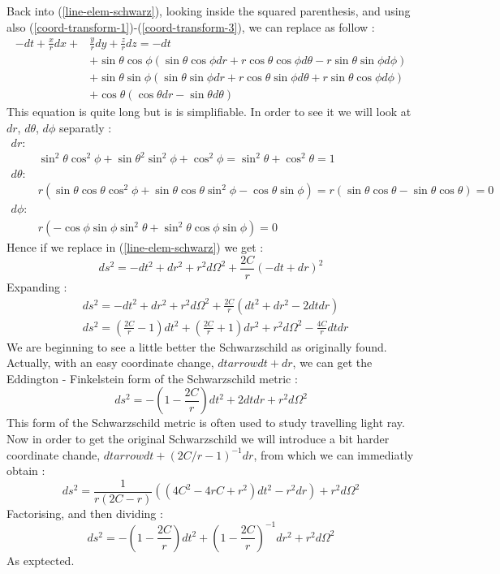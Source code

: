 \documentclass[a4paper,12pt]{article}
\theoremstyle{definition}
\begin{document}
Back into (\ref{line-elem-schwarz}), looking inside the squared parenthesis, and using also (\ref{coord-transform-1})-(\ref{coord-transform-3}), we can replace as follow :
\begin{align}
	-dt+\frac{x}{r}dx+&\frac{y}{r}dy+\frac{z}{r}dz =-dt\\
	&+\sin{\theta} \cos{\phi} (\sin{\theta} \cos{\phi} dr+r\cos{\theta} \cos{\phi} d\theta -r\sin{\theta} \sin{\phi} d\phi )\\
	&+\sin{\theta} \sin{\phi} (\sin{\theta} \sin{\phi} dr+r\cos{\theta} \sin{\phi} d\theta +r\sin{\theta} \cos{\phi} d\phi )\\
	&+\cos{\theta} (\cos{\theta} dr-\sin{\theta} d\theta )
\end{align}
This equation is quite long but is is simplifiable. In order to see it  we will look at $dr$, $d\theta$, $d\phi$ separatly :
\begin{align}
	dr :& \\
	&\sin^2{\theta}\cos^2{\phi}+\sin{\theta}^2\sin^2{\phi}+\cos^2{\phi}=\sin^2{\theta}+\cos^2{\theta}=1\\
	d\theta :& \\
	&r(\sin{\theta}\cos{\theta}\cos^2{\phi}+\sin{\theta}\cos{\theta}\sin^2{\phi}-\cos{\theta}\sin{\phi})=r(\sin{\theta}\cos{\theta}-\sin{\theta}\cos{\theta})=0\\
	d\phi :& \\
	&r(-\cos{\phi}\sin{\phi}\sin^2{\theta}+\sin^2{\theta}\cos{\phi}\sin{\phi})=0
\end{align}
Hence if we replace in (\ref{line-elem-schwarz}) we get :
\begin{equation}
	ds^2=-dt^2+dr^2+r^2d\Omega^2+\frac{2C}{r}(-dt+dr)^2
\end{equation}
Expanding :
\begin{align}
	&ds^2=-dt^2+dr^2+r^2d\Omega^2+\frac{2C}{r}(dt^2+dr^2-2dtdr)\\
	&ds^2=(\frac{2C}{r}-1)dt^2+(\frac{2C}{r}+1)dr^2+r^2d\Omega^2-\frac{4C}{r}dtdr
\end{align}
We are beginning to see a little better the Schwarzschild as originally found.
Actually, with an easy coordinate change, $dtarrow dt+dr$, we can get the Eddington - Finkelstein form of the Schwarzschild metric :
\begin{equation}
	ds^2=-(1-\frac{2C}{r})dt^2+2dtdr+r^2d\Omega^2
\end{equation}
This form of the Schwarzschild metric is often used to study travelling light ray.
Now in order to get the original Schwarzschild we will introduce a bit harder coordinate chande, $dtarrow dt+(2C/r-1)^{-1}dr$, from which we can immediatly obtain :
\begin{equation}
	ds^2=\frac{1}{r(2C-r)}((4C^2-4rC+r^2)dt^2-r^2dr)+r^2d\Omega^2
\end{equation}
Factorising, and then dividing :
\begin{equation}
	ds^2=-(1-\frac{2C}{r})dt^2+(1-\frac{2C}{r})^{-1}dr^2+r^2d\Omega^2
\end{equation}
As exptected.
\end{document}
